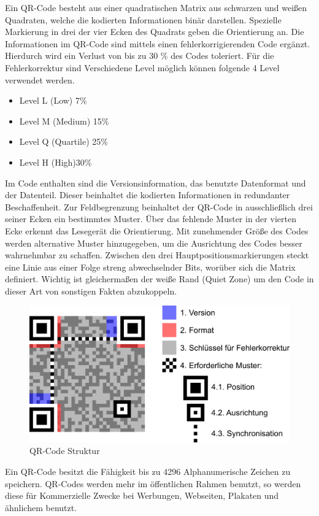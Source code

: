 \documentclass[12pt,					%
							 oneside,			%
							 a4paper,			%
							 halfparskip,		%
							 liststotoc,			%
							 bibtotoc,			%
							 fleqn,				%
							 pointlessnumbers]	%
							 {scrreprt}
\begin{document}
Ein QR-Code besteht aus einer quadratischen Matrix aus schwarzen und weißen Quadraten, welche die kodierten Informationen binär darstellen. Spezielle Markierung in drei der vier Ecken des Quadrats geben die Orientierung an. Die Informationen im QR-Code sind mittels einen fehlerkorrigierenden Code ergänzt. Hierdurch wird ein Verlust von bis zu 30 \% des Codes toleriert. Für die Fehlerkorrektur sind Verschiedene Level möglich können folgende 4 Level verwendet werden.
\begin{itemize}
\item Level L (Low) 7\%
\item Level M (Medium) 15\%
\item Level Q (Quartile) 25\% 
\item Level H (High)30\% 
\end{itemize}


Im Code enthalten sind die Versionsinformation, das benutzte Datenformat und der Datenteil. Dieser beinhaltet die kodierten Informationen in redundanter Beschaffenheit. Zur Feldbegrenzung beinhaltet der QR-Code in ausschließlich drei seiner Ecken ein bestimmtes Muster. Über das fehlende Muster in der vierten Ecke erkennt das Lesegerät die Orientierung. Mit zunehmender Größe des Codes werden alternative Muster hinzugegeben, um die Ausrichtung des Codes besser wahrnehmbar zu schaffen. Zwischen den drei Hauptpositionsmarkierungen steckt eine Linie aus einer Folge streng abwechselnder Bits, worüber sich die Matrix definiert. Wichtig ist gleichermaßen der weiße Rand (Quiet Zone) um den Code in dieser Art von sonstigen Fakten abzukoppeln. 
\begin{figure}[ht]
\centering   
	 \includegraphics[scale=0.12]{pictures/QRCodeBild} 
 	\caption{QR-Code Struktur \cite{qrexapmle}}
\end{figure}

Ein QR-Code besitzt die Fähigkeit bis zu 4296 Alphanumerische Zeichen zu speichern. QR-Codes werden mehr im öffentlichen Rahmen benutzt, so werden diese für Kommerzielle Zwecke bei Werbungen, Webseiten, Plakaten und ähnlichem benutzt.
\end{document}
